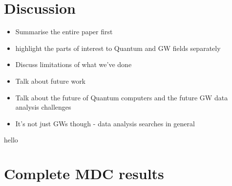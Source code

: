 \documentclass[aps,prd,nofootinbib,twocolumn,reprint,superscriptaddress,showpacs,showkeys,longbibliography]{revtex4-1}
\begin{document}
\section{Discussion}\label{sec:discussion}

\begin{itemize}
\item Summarise the entire paper first
\item highlight the parts of interest to Quantum and GW fields separately
\item Discuss limitations of what we've done
\item Talk about future work
\item Talk about the future of Quantum computers and the future GW data
analysis challenges
\item It's not just GWs though - data analysis searches in general
\end{itemize}

\begin{acknowledgments}
hello
\end{acknowledgments}


\appendix

\section{Complete MDC results\label{sec:fullresults}}



\end{document}
